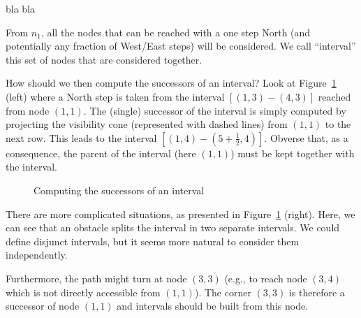 bla bla

From $n_1$, all the nodes that can be reached with a one step North 
(and potentially any fraction of West/East steps) will be considered.  
We call ``interval'' this set of nodes that are considered together.  

How should we then compute the successors of an interval?  
Look at Figure~\ref{fig::succ1} (left) 
where a North step is taken from the interval $[(1,3)-(4,3)]$
reached from node $(1,1)$.  
The (single) successor of the interval 
is simply computed by projecting the visibility cone 
(represented with dashed lines)
from $(1,1)$ to the next row.  
This leads to the interval $[(1,4)-(5+\frac{1}{2},4)]$.  
Obverse that, as a consequence, the parent of the interval 
(here $(1,1)$) must be kept together with the interval.  

\begin{figure}[ht]
  \begin{minipage}{0.5\linewidth}
  \begin{center}
    
  \end{center}
  \end{minipage}
  \begin{minipage}{0.5\linewidth}
  \begin{center}
    
  \end{center}
  \end{minipage}
  \caption{Computing the successors of an interval}
  \label{fig::succ1}
\end{figure}

There are more complicated situations, 
as presented in Figure~\ref{fig::succ1} (right).  
Here, we can see that an obstacle splits the interval 
in two separate intervals.  
We could define disjunct intervals, 
but it seems more natural to consider them independently.  

Furthermore, the path might turn at node $(3,3)$
(e.g., to reach node $(3,4)$
which is not directly accessible from $(1,1)$).  
The corner $(3,3)$ is therefore a successor of node $(1,1)$ 
and intervals should be built from this node.  

